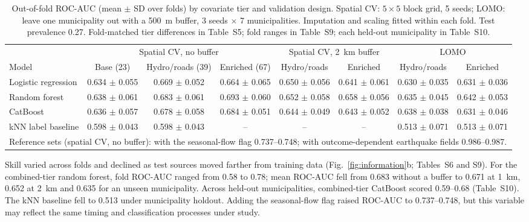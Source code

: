 \documentclass[preprint,12pt,authoryear]{elsarticle}
\newcommand{\auc}{ROC-AUC}
\begin{document}
\begin{table}[!htbp]
  \centering
  \caption{Out-of-fold \auc{} (mean $\pm$ SD over folds) by covariate tier and validation design. Spatial CV: $5 \times 5$ block grid, 5 seeds; LOMO: leave one municipality out with a \SI{500}{\metre} buffer, 3 seeds $\times$ 7 municipalities. Imputation and scaling fitted within each fold. Test prevalence 0.27. Fold-matched tier differences in Table~S5; fold ranges in Table~S9; each held-out municipality in Table~S10.}
  \label{tab:benchmark}
  \small
  \begin{adjustbox}{max width=\linewidth}
  \begin{tabular}{lccccccc}
    \toprule
     & \multicolumn{3}{c}{Spatial CV, no buffer} & \multicolumn{2}{c}{Spatial CV, \SI{2}{\kilo\metre} buffer} & \multicolumn{2}{c}{LOMO} \\
    \cmidrule(lr){2-4}\cmidrule(lr){5-6}\cmidrule(lr){7-8}
    Model & Base (23) & Hydro/roads (39) & Enriched (67) & Hydro/roads & Enriched & Hydro/roads & Enriched \\
    \midrule
    Logistic regression & 0.634 $\pm$ 0.055 & 0.669 $\pm$ 0.052 & 0.664 $\pm$ 0.065 & 0.650 $\pm$ 0.056 & 0.641 $\pm$ 0.061 & 0.630 $\pm$ 0.035 & 0.631 $\pm$ 0.036 \\
    Random forest       & 0.638 $\pm$ 0.061 & 0.683 $\pm$ 0.061 & 0.693 $\pm$ 0.060 & 0.652 $\pm$ 0.058 & 0.658 $\pm$ 0.056 & 0.635 $\pm$ 0.045 & 0.642 $\pm$ 0.053 \\
    CatBoost            & 0.636 $\pm$ 0.057 & 0.678 $\pm$ 0.058 & 0.684 $\pm$ 0.051 & 0.644 $\pm$ 0.049 & 0.643 $\pm$ 0.052 & 0.638 $\pm$ 0.038 & 0.631 $\pm$ 0.046 \\
    kNN label baseline  & 0.598 $\pm$ 0.043 & 0.598 $\pm$ 0.043 & -- & -- & -- & 0.513 $\pm$ 0.071 & 0.513 $\pm$ 0.071 \\
    \midrule
    \multicolumn{8}{l}{Reference sets (spatial CV, no buffer): with the seasonal-flow flag 0.737--0.748; with outcome-dependent earthquake fields 0.986--0.987.} \\
    \bottomrule
  \end{tabular}
  \end{adjustbox}
\end{table}

Skill varied across folds and declined as test sources moved farther from training data (Fig.~\ref{fig:information}b; Tables~S6 and S9). For the combined-tier random forest, fold \auc{} ranged from 0.58 to 0.78; mean \auc{} fell from 0.683 without a buffer to 0.671 at \SI{1}{\kilo\metre}, 0.652 at \SI{2}{\kilo\metre} and 0.635 for an unseen municipality. Across held-out municipalities, combined-tier CatBoost scored 0.59--0.68 (Table~S10). The kNN baseline fell to 0.513 under municipality holdout. Adding the seasonal-flow flag raised \auc{} to 0.737--0.748, but this variable may reflect the same timing and classification processes under study.
\end{document}
